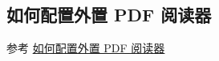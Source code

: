 
\subsection{如何配置外置 PDF 阅读器}

参考 \href{https://gitee.com/xkwxdyy/CCNUthesis/wikis/%E5%AE%89%E8%A3%85%E9%85%8D%E7%BD%AE%E5%A4%96%E7%BD%AEPDF%E9%98%85%E8%AF%BB%E5%99%A8}{如何配置外置 PDF 阅读器}
